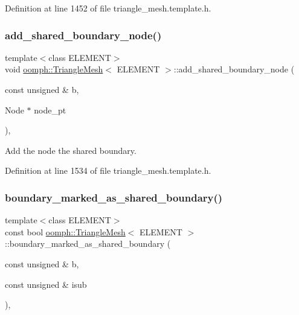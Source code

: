 Definition at line 1452 of file triangle\+\_\+mesh.\+template.\+h.

\mbox{\label{classoomph_1_1TriangleMesh_a56132de18ed5754ac30202036025347b}} 
\subsubsection{\texorpdfstring{add\+\_\+shared\+\_\+boundary\+\_\+node()}{add\_shared\_boundary\_node()}}
{\footnotesize\ttfamily template$<$class E\+L\+E\+M\+E\+NT$>$ \\
void \hyperlink{classoomph_1_1TriangleMesh}{oomph\+::\+Triangle\+Mesh}$<$ E\+L\+E\+M\+E\+NT $>$\+::add\+\_\+shared\+\_\+boundary\+\_\+node (\begin{DoxyParamCaption}\item[{const unsigned \&}]{b,  }\item[{Node $\ast$}]{node\+\_\+pt }\end{DoxyParamCaption})\hspace{0.3cm}{\ttfamily [inline]}, {\ttfamily [protected]}}



Add the node the shared boundary. 



Definition at line 1534 of file triangle\+\_\+mesh.\+template.\+h.

\mbox{\label{classoomph_1_1TriangleMesh_ab627d8ade5dbc13df4478a9c9c44fbfa}} 
\subsubsection{\texorpdfstring{boundary\+\_\+marked\+\_\+as\+\_\+shared\+\_\+boundary()}{boundary\_marked\_as\_shared\_boundary()}}
{\footnotesize\ttfamily template$<$class E\+L\+E\+M\+E\+NT$>$ \\
const bool \hyperlink{classoomph_1_1TriangleMesh}{oomph\+::\+Triangle\+Mesh}$<$ E\+L\+E\+M\+E\+NT $>$\+::boundary\+\_\+marked\+\_\+as\+\_\+shared\+\_\+boundary (\begin{DoxyParamCaption}\item[{const unsigned \&}]{b,  }\item[{const unsigned \&}]{isub }\end{DoxyParamCaption})\hspace{0.3cm}{\ttfamily [inline]}, {\ttfamily [protected]}}



